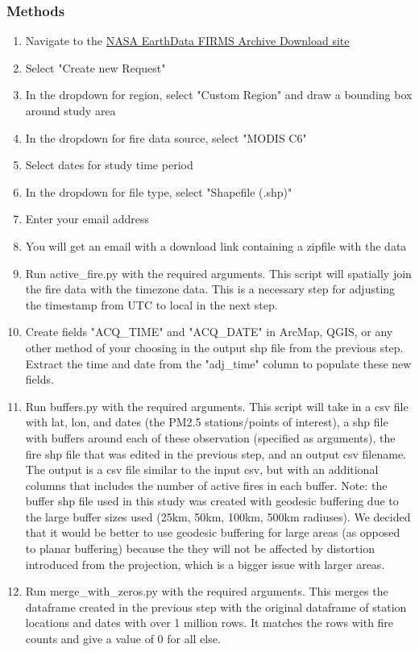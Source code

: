 \subsubsection*{Methods}
\begin{enumerate}
\item Navigate to the \href{https://firms.modaps.eosdis.nasa.gov/download/}{NASA EarthData FIRMS Archive Download site}
\item Select "Create new Request"
\item In the dropdown for region, select "Custom Region" and draw a bounding box around study area
\item In the dropdown for fire data source, select "MODIS C6"
\item Select dates for study time period
\item In the dropdown for file type, select "Shapefile (.shp)"
\item Enter your email address
\item You will get an email with a download link containing a zipfile with the data
\item Run active\_fire.py with the required arguments. This script will spatially join the fire data with the timezone data. This is a necessary step for adjusting the timestamp from UTC to local in the next step.
\item Create fields "ACQ\_TIME" and "ACQ\_DATE" in ArcMap, QGIS, or any other method of your choosing in the output shp file from the previous step. Extract the time and date from the "adj\_time" column to populate these new fields. 
\item Run buffers.py with the required arguments. This script will take in a csv file with lat, lon, and dates (the PM2.5 stations/points of interest), a shp file with buffers around each of these observation (specified as arguments), the fire shp file that was edited in the previous step, 
and an output csv filename. The output is a csv file similar to the input csv, but with an additional columns that includes the number of active fires in each buffer. Note: the buffer shp file used in this study was created with geodesic buffering due to the large buffer sizes used (25km, 50km, 100km, 500km radiuses).
We decided that it would be better to use geodesic buffering for large areas (as opposed to planar buffering) because the they will not be affected by distortion introduced from the projection, which is a bigger issue with larger areas.
\item Run merge\_with\_zeros.py with the required arguments. This merges the dataframe created in the previous step with the original dataframe of station locations and dates with over 1 million rows. It matches the rows with fire counts and give a value of 0 for all else.
\end{enumerate}
